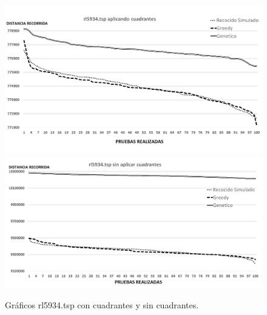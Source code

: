  \begin{figure}[hbtp]
    \centering
        \includegraphics[width=1\textwidth]{PruebasResultados/Experimentos_Graficos_Con/rl5934.png}
        \includegraphics[width=1\textwidth]{PruebasResultados/Experimentos_Graficos_Sin/rl5934.png}
        \caption{Gráficos rl5934.tsp con cuadrantes y sin cuadrantes.}
        \label{fig:rl5934_grafica.png}
\end{figure}
\newpage
